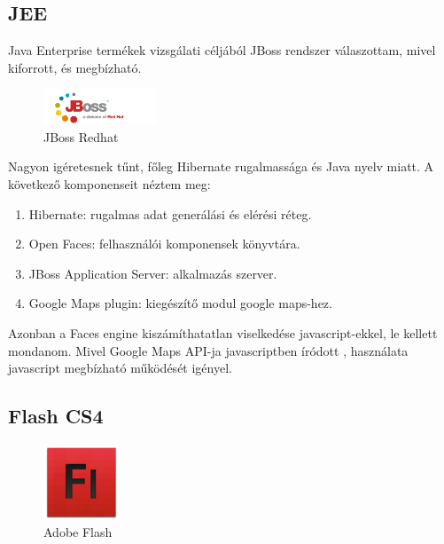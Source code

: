 		\subsection{JEE} %
		Java Enterprise termékek vizsgálati céljából JBoss rendszer válaszottam, mivel kiforrott, és megbízható.\\
		\label{sub:jee}
		
		\begin{figure}
		  \vspace{-20pt}
		  \begin{center}
		    \includegraphics[width=0.30\textwidth]{chapters/chap5/img/jboss.jpg}
		  \end{center}
		  \vspace{-20pt}
		  \caption{JBoss Redhat}
		\end{figure}
		

		Nagyon igéretesnek tűnt, főleg Hibernate rugalmassága és Java nyelv miatt. A következő komponenseit néztem meg:
		\begin{enumerate}
			\item Hibernate: rugalmas adat generálási és elérési réteg.
			\item Open Faces: felhasználói komponensek könyvtára.
			\item JBoss Application Server: alkalmazás szerver.
			\item Google Maps plugin: kiegészítő modul google maps-hez.
		\end{enumerate}
		Azonban a Faces engine kiszámíthatatlan viselkedése javascript-ekkel, le kellett mondanom. Mivel Google Maps API-ja javascriptben íródott
		, használata javascript megbízható működését igényel.
		
		\subsection{Flash CS4} %
		\label{sub:flash_cs4}
		
		\begin{figure}
		  \vspace{-20pt}
		  \begin{center}
		    \includegraphics[width=0.2\textwidth]{chapters/chap5/img/fl.png}
		  \end{center}
		  \vspace{-20pt}
		  \caption{Adobe Flash}
		\end{figure}

